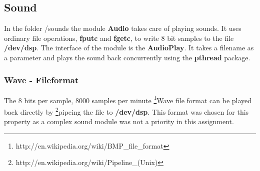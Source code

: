 \subsection{Sound}
In the folder /sounds the module {\bf Audio} takes care of playing sounds. It uses ordinary file
operations, {\bf fputc} and {\bf fgetc}, to write 8 bit samples to the file {\bf /dev/dsp}. The
interface of the module is the {\bf AudioPlay}. It takes a filename as a parameter and plays the
sound back concurrently using the {\bf pthread} package.

\subsubsection{Wave - Fileformat}
The 8 bits per sample, 8000 samples per
minute \footnote{http://en.wikipedia.org/wiki/BMP\_file\_format}{Wave file format} can be played
back directly by \footnote{http://en.wikipedia.org/wiki/Pipeline\_(Unix)}{pipeing} the file to {\bf
  /dev/dsp}. This format was chosen for this property as a complex sound module was not a priority
in this assignment.
